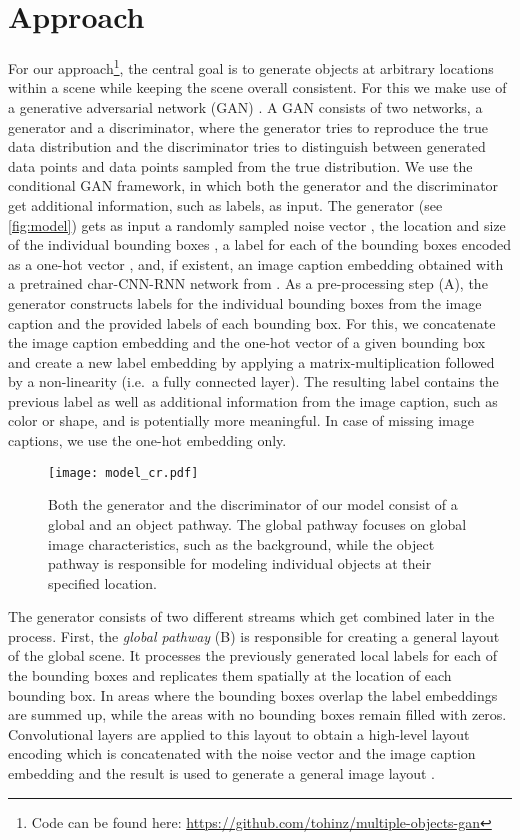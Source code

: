 \documentclass{article} \usepackage{iclr2019_conference,times}
\begin{document}
	\section{Approach}
For our approach\footnote{Code can be found here: \url{https://github.com/tohinz/multiple-objects-gan}}, the central goal is to generate objects at arbitrary locations within a scene while keeping the scene overall consistent.
	For this we make use of a generative adversarial network (GAN) \citep{goodfellow2014generative}.
	A GAN consists of two networks, a generator and a discriminator, where the generator tries to reproduce the true data distribution and the discriminator tries to distinguish between generated data points and data points sampled from the true distribution.
	We use the conditional GAN framework, in which both the generator and the discriminator get additional information, such as labels, as input.
	The generator  (see \autoref{fig:model}) gets as input a randomly sampled noise vector , the location and size of the individual bounding boxes , a label for each of the bounding boxes encoded as a one-hot vector , and, if existent, an image caption embedding  obtained with a pretrained char-CNN-RNN network from \cite{reed2016generative}.
	As a pre-processing step (A), the generator constructs labels  for the individual bounding boxes from the image caption  and the provided labels  of each bounding box.
	For this, we concatenate the image caption embedding  and the one-hot vector of a given bounding box  and create a new label embedding  by applying a matrix-multiplication followed by a non-linearity (i.e.\ a fully connected layer).
	The resulting label  contains the previous label as well as additional information from the image caption, such as color or shape, and is potentially more meaningful.
	In case of missing image captions, we use the one-hot embedding  only.
	\begin{figure}[tb]
		\centering
		\texttt{[image: model\_cr.pdf]}
		\caption{Both the generator and the discriminator of our model consist of a global and an object pathway. The global pathway focuses on global image characteristics, such as the background, while the object pathway is responsible for modeling individual objects at their specified location.}
		\label{fig:model}
	\end{figure}
	
	The generator consists of two different streams which get combined later in the process.
	First, the \emph{global pathway} (B) is responsible for creating a general layout of the global scene.
	It processes the previously generated local labels  for each of the bounding boxes and replicates them spatially at the location of each bounding box.
	In areas where the bounding boxes overlap the label embeddings  are summed up, while the areas with no bounding boxes remain filled with zeros.
	Convolutional layers are applied to this layout to obtain a high-level layout encoding which is concatenated with the noise vector  and the image caption embedding  and the result is used to generate a general image layout .
\end{document}
